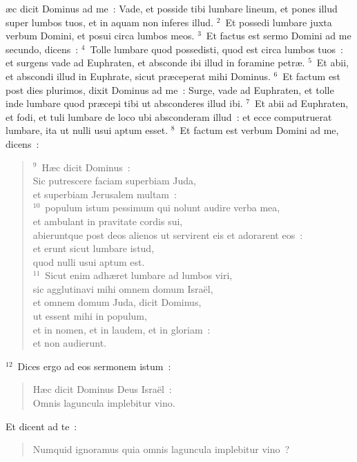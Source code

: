 


\bchapter
{}\ae c dicit Dominus ad me~: Vade, et posside tibi lumbare lineum, et pones illud super lumbos tuos, et in aquam non inferes illud.
${}^{2}$~Et possedi lumbare juxta verbum Domini, et posui circa lumbos meos.
${}^{3}$~Et factus est sermo Domini ad me secundo, dicens~:
${}^{4}$~Tolle lumbare quod possedisti, quod est circa lumbos tuos~: et surgens vade ad Euphraten, et absconde ibi illud in foramine petr\ae .
${}^{5}$~Et abii, et abscondi illud in Euphrate, sicut pr\ae ceperat mihi Dominus.
${}^{6}$~Et factum est post dies plurimos, dixit Dominus ad me~: Surge, vade ad Euphraten, et tolle inde lumbare quod pr\ae cepi tibi ut absconderes illud ibi.
${}^{7}$~Et abii ad Euphraten, et fodi, et tuli lumbare de loco ubi absconderam illud~: et ecce computruerat lumbare, ita ut nulli usui aptum esset.
${}^{8}$~Et factum est verbum Domini ad me, dicens~:
\begin{verse}${}^{9}$~H\ae c dicit Dominus~:\\ Sic putrescere faciam superbiam Juda,\\ et superbiam Jerusalem multam~:\\
${}^{10}$~populum istum pessimum qui nolunt audire verba mea,\\ et ambulant in pravitate cordis sui,\\ abieruntque post deos alienos ut servirent eis et adorarent eos~:\\ et erunt sicut lumbare istud,\\ quod nulli usui aptum est.\\
${}^{11}$~Sicut enim adh\ae ret lumbare ad lumbos viri,\\ sic agglutinavi mihi omnem domum Isra\"el,\\ et omnem domum Juda, dicit Dominus,\\ ut essent mihi in populum,\\ et in nomen, et in laudem, et in gloriam~:\\ et non audierunt.\end{verse}


${}^{12}$~Dices ergo ad eos sermonem istum~: \begin{verse}H\ae c dicit Dominus Deus Isra\"el~:\\ Omnis laguncula implebitur vino.\end{verse}

 Et dicent ad te~: \begin{verse}Numquid ignoramus quia omnis laguncula implebitur vino~?\end{verse}


